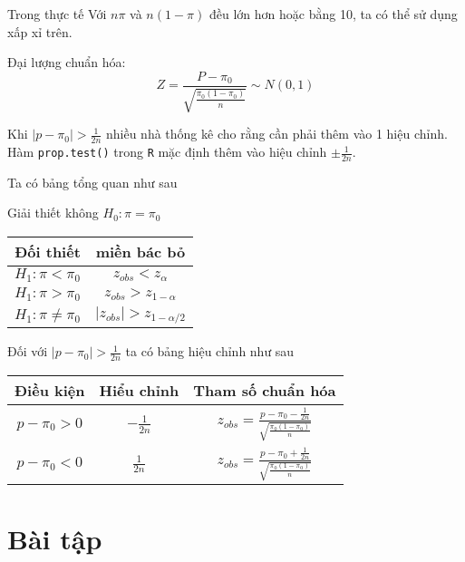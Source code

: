 Trong thực tế Với $n\pi$ và $n(1 - \pi)$ đều lớn hơn hoặc bằng 10, ta có thể sử dụng xấp xỉ trên.

Đại lượng chuẩn hóa:
\begin{equation}
    Z = \frac{P - \pi_0}{\sqrt{\frac{\pi_0(1 - \pi_0)}{n}}} \sim N(0, 1)
\end{equation}

Khi $|p - \pi_0| > \frac{1}{2n}$ nhiều nhà thống kê cho rằng cần phải thêm vào 1 hiệu chỉnh. 
Hàm \lstinline{prop.test()} trong \lstinline{R} mặc định thêm vào hiệu chỉnh $\pm \frac{1}{2n}$.

Ta có bảng tổng quan như sau

Giải thiết không $H_0: \pi = \pi_0$

\begin{center}
    \begin{tabular}{| c | c |}
        \hline
        Đối thiết & miền bác bỏ \\
        \hline
        $H_1: \pi < \pi_0$ & $z_{obs} < z_\alpha$ \\ 
        \hline 
        $H_1: \pi > \pi_0$ & $z_{obs} > z_{1 - \alpha}$ \\
        \hline
        $H_1: \pi \neq \pi_0$ & $|z_{obs}| > z_{1 - \alpha / 2}$ \\
        \hline
    \end{tabular}
\end{center}

Đối với $|p - \pi_0| > \frac{1}{2n}$ ta có bảng hiệu chỉnh như sau

\begin{center}
    \begin{tabular}{| c | c | c |}
        \hline
        Điều kiện & Hiểu chỉnh & Tham số chuẩn hóa\\
        \hline
        $p - \pi_0 > 0$ & $-\frac{1}{2n}$ & $z_{obs} = \frac{p - \pi_0 - 
        \frac{1}{2n}}{\sqrt{\frac{\pi_0(1 - \pi_0)}{n}}}$ \\ 
        \hline 
        $p - \pi_0 < 0$ & $\frac{1}{2n}$ & $z_{obs} = \frac{p - \pi_0 + 
        \frac{1}{2n}}{\sqrt{\frac{\pi_0(1 - \pi_0)}{n}}}$ \\ 
        \hline
    \end{tabular}
\end{center}

\section{Bài tập}

